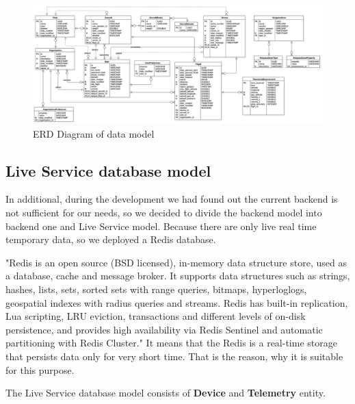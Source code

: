 \begin{figure}
    \centering
    \includegraphics[scale=0.31, angle=90]{assets/erd_diagram.png}
    \caption{ERD Diagram of data model\cite{dataModel}}
    \label{fig:erd-diagram}
\end{figure}

\subsection{Live Service database model}\label{subsec:live-service-database-model}
In additional, during the development we had found out the current backend is not sufficient for our needs, so we decided to divide the backend model into backend one and Live Service model.
Because there are only live real time temporary data, so we deployed a Redis database.

"Redis is an open source (BSD licensed), in-memory data structure store, used as a database, cache and message broker.
It supports data structures such as strings, hashes, lists, sets, sorted sets with range queries, bitmaps, hyperloglogs, geospatial indexes with radius queries and streams.
Redis has built-in replication, Lua scripting, LRU eviction, transactions and different levels of on-disk persistence, and provides high availability via Redis Sentinel and automatic partitioning with Redis Cluster."\cite{redis}
It means that the Redis is a real-time storage that persists data only for very short time.
That is the reason, why it is suitable for this purpose.

The Live Service database model consists of \textbf{Device} and \textbf{Telemetry} entity.

